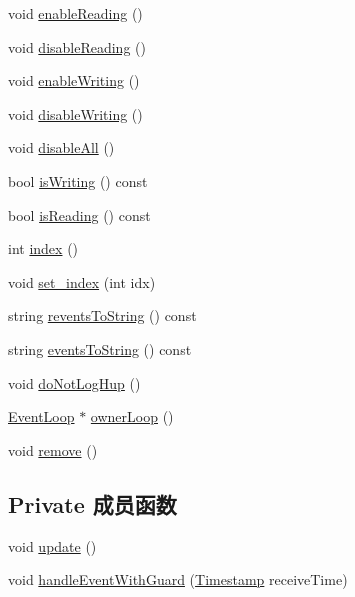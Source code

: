 \begin{DoxyCompactItemize}
\item 
void \hyperlink{classmuduo_1_1net_1_1Channel_ad31f735a6d5ad83203d977ad8eafb223}{enable\+Reading} ()
\item 
void \hyperlink{classmuduo_1_1net_1_1Channel_aa27263032d6b3a79edb4e99537293c37}{disable\+Reading} ()
\item 
void \hyperlink{classmuduo_1_1net_1_1Channel_af1dff4317f202ed06097a1425a4dca6d}{enable\+Writing} ()
\item 
void \hyperlink{classmuduo_1_1net_1_1Channel_a97cbc4c0678234e62a4a9d906e064cdf}{disable\+Writing} ()
\item 
void \hyperlink{classmuduo_1_1net_1_1Channel_a238885c747f586049b766fa4fcd5ec12}{disable\+All} ()
\item 
bool \hyperlink{classmuduo_1_1net_1_1Channel_a181a6a67a97d760db63a2c3294ed22e3}{is\+Writing} () const
\item 
bool \hyperlink{classmuduo_1_1net_1_1Channel_ad1585484cec92cacd15885c798456205}{is\+Reading} () const
\item 
int \hyperlink{classmuduo_1_1net_1_1Channel_a019749328da42c4814af71d3e3b647ad}{index} ()
\item 
void \hyperlink{classmuduo_1_1net_1_1Channel_ac9a4cd0efc3148a6fee45b2ab4f61cb6}{set\+\_\+index} (int idx)
\item 
string \hyperlink{classmuduo_1_1net_1_1Channel_a999f712b429fc3bef932df5198f93ad7}{revents\+To\+String} () const
\item 
string \hyperlink{classmuduo_1_1net_1_1Channel_aebf2f9df0b2ab24a22a9e50d6f619a89}{events\+To\+String} () const
\item 
void \hyperlink{classmuduo_1_1net_1_1Channel_a3fbec0f3acd6ebea5b36f77f653303b4}{do\+Not\+Log\+Hup} ()
\item 
\hyperlink{classmuduo_1_1net_1_1EventLoop}{Event\+Loop} $\ast$ \hyperlink{classmuduo_1_1net_1_1Channel_a2e24e2ab7ada4682fdf49cc835d85e8d}{owner\+Loop} ()
\item 
void \hyperlink{classmuduo_1_1net_1_1Channel_a1fcb45e5d2428352eb36b487d1d4eea3}{remove} ()
\end{DoxyCompactItemize}
\subsection*{Private 成员函数}
\begin{DoxyCompactItemize}
\item 
void \hyperlink{classmuduo_1_1net_1_1Channel_ac5c54df7ed3b930268c8d7752c101725}{update} ()
\item 
void \hyperlink{classmuduo_1_1net_1_1Channel_a5af6a03aff8712d6b8276358c4ce604c}{handle\+Event\+With\+Guard} (\hyperlink{classmuduo_1_1Timestamp}{Timestamp} receive\+Time)
\end{DoxyCompactItemize}
